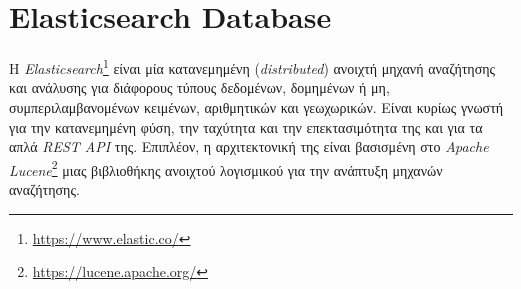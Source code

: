 \section{Elasticsearch Database}
\label{sec:elastic}
Η \emph{Elasticsearch}\footnote{\url{https://www.elastic.co/}} είναι μία κατανεμημένη (\emph{distributed}) ανοιχτή μηχανή αναζήτησης και ανάλυσης για διάφορους τύπους δεδομένων, δομημένων ή μη, συμπεριλαμβανομένων κειμένων, αριθμητικών και γεωχωρικών. Είναι κυρίως γνωστή για την κατανεμημένη φύση, την ταχύτητα και την επεκτασιμότητα της και για τα απλά \emph{REST API} της. Επιπλέον, η αρχιτεκτονική της είναι βασισμένη στο \emph{Apache Lucene}\footnote{\url{https://lucene.apache.org/}} μιας βιβλιοθήκης ανοιχτού λογισμικού για την ανάπτυξη μηχανών αναζήτησης. 